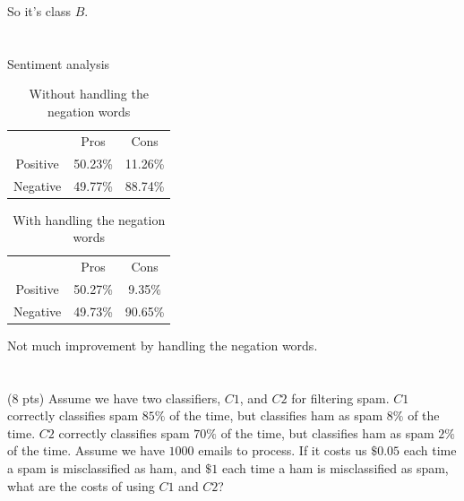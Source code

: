 \documentclass[paper=a4, fontsize=11pt]{scrartcl} %
\begin{document}
So it's class $B$.

\pagebreak

\section{}

\begin{fancyquotes}
  Sentiment analysis
\end{fancyquotes}

\begin{table}[hp]
  \centering
  \begin{tabular}[hp]{ccc}
    & Pros & Cons \\
    Positive & 50.23\% & 11.26\% \\
    Negative & 49.77\% & 88.74\%
  \end{tabular}
  \caption{Without handling the negation words}
\end{table}

\begin{table}[hp]
  \centering
  \begin{tabular}[hp]{ccc}
    & Pros & Cons \\
    Positive & 50.27\% & 9.35\% \\
    Negative & 49.73\% & 90.65\%
  \end{tabular}
  \caption{With handling the negation words}
\end{table}

Not much improvement by handling the negation words.

\pagebreak


\section{}

\subsection{}
\begin{fancyquotes}
  (8 pts) Assume we have two classifiers, $C1$, and $C2$ for filtering
  spam. $C1$ correctly classifies spam $85\%$ of the time, but
  classifies ham as spam $8\%$ of the time. $C2$ correctly classifies
  spam $70\%$ of the time, but classifies ham as spam $2\%$ of the
  time. Assume we have $1000$ emails to process. If it costs us
  $\$0.05$ each time a spam is misclassified as ham, and $\$1$ each
  time a ham is misclassified as spam, what are the costs of using
  $C1$ and $C2$?
\end{fancyquotes}
\end{document}
